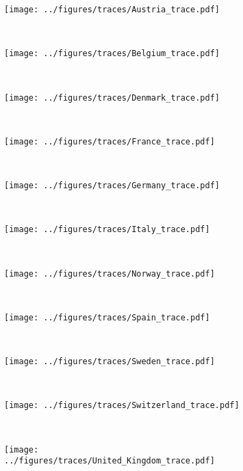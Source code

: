 \documentclass[12pt]{extarticle}
\begin{document}
\begin{figure}[p]	
    \centering
    \begin{subfigure}{0.32\textwidth}
        \texttt{[image: ../figures/traces/Austria\_trace.pdf]}
    \end{subfigure}
    ~%
    \begin{subfigure}{0.32\textwidth}
        \texttt{[image: ../figures/traces/Belgium\_trace.pdf]}
    \end{subfigure}
    ~%
    \begin{subfigure}{0.32\textwidth}
        \texttt{[image: ../figures/traces/Denmark\_trace.pdf]}
    \end{subfigure}
	~%
    \begin{subfigure}{0.32\textwidth}
        \texttt{[image: ../figures/traces/France\_trace.pdf]}
    \end{subfigure}
    ~%
    \begin{subfigure}{0.32\textwidth}
        \texttt{[image: ../figures/traces/Germany\_trace.pdf]}
    \end{subfigure}
    ~%
    \begin{subfigure}{0.32\textwidth}
        \texttt{[image: ../figures/traces/Italy\_trace.pdf]}
    \end{subfigure}
    ~%
	\begin{subfigure}{0.32\textwidth}
        \texttt{[image: ../figures/traces/Norway\_trace.pdf]}
    \end{subfigure}
    ~%
	\begin{subfigure}{0.32\textwidth}
        \texttt{[image: ../figures/traces/Spain\_trace.pdf]}
    \end{subfigure}
    ~%
	\begin{subfigure}{0.32\textwidth}
        \texttt{[image: ../figures/traces/Sweden\_trace.pdf]}
    \end{subfigure}
    ~%
	\begin{subfigure}{0.32\textwidth}
        \texttt{[image: ../figures/traces/Switzerland\_trace.pdf]}
    \end{subfigure}
    ~%
	\begin{subfigure}{0.32\textwidth}
        \texttt{[image: ../figures/traces/United\_Kingdom\_trace.pdf]}
    \end{subfigure}
    ~%
	\begin{subfigure}{0.32\textwidth}

\end{subfigure}
\end{figure}
\end{document}
